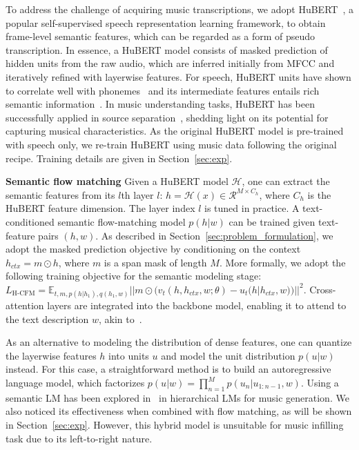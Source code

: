 To  address the challenge of acquiring music transcriptions, we adopt HuBERT~\cite{Hsu2021HuBERTSS}, a popular self-supervised speech representation learning framework, to obtain frame-level semantic features, which can be regarded as a form of pseudo transcription. In essence, a HuBERT model consists of masked prediction of hidden units from the raw audio, which are inferred initially from MFCC and iteratively refined with layerwise features. For speech, HuBERT units have shown to correlate well with phonemes~\cite{Hsu2021HuBERTSS} and its intermediate features entails rich semantic information~\cite{Pasad2023comparative}. In music understanding tasks, HuBERT has been successfully applied in source separation~\cite{Pasini2023SelfSupervisedMS}, shedding light on its potential for capturing musical characteristics. As the original HuBERT model is pre-trained with speech only, we re-train HuBERT using music data following the original recipe. Training details are given in Section~\ref{sec:exp}.

\textbf{Semantic flow matching} Given a HuBERT model $\mathcal{H}$, one can extract the semantic features from its $l$th layer $l$: $h = \mathcal{H}(x) \in \mathcal{R}^{M\times C_h}$, where $C_h$ is the HuBERT feature dimension. The layer index $l$ is tuned in practice. A text-conditioned semantic flow-matching model $p(h|w)$ can be trained given text-feature pairs $(h, w)$. As described in Section~\ref{sec:problem_formulation}, we adopt the masked prediction objective by conditioning on the context $h_{ctx}=m\odot h$, where $m$ is a span mask of length $M$. More formally, we adopt the following training objective for the semantic modeling stage: $L_{\text{H-CFM}}=\mathbb{E}_{t,m,p(h|h_1),q(h_1,w)}||m\odot(v_t(h,h_{ctx},w;\theta)-u_t(h|h_{ctx},w))||^2$.
Cross-attention layers are integrated into the backbone model, enabling it to attend to the text description $w$, akin to~\cite{rombach2021highresolution}. 

As an alternative to modeling the distribution of dense features, one can quantize the layerwise features $h$ into units $u$ and model the unit distribution $p(u|w)$ instead. For this case, a straightforward method is to build an autoregressive language model, which factorizes $p(u|w)=\displaystyle\prod_{n=1}^{M}p(u_{n}|u_{1:{n-1}},w)$. Using a semantic LM has been explored in~\cite{musiclm} in hierarchical LMs for music generation. We also noticed its effectiveness when combined with flow matching, as will be shown in Section~\ref{sec:exp}. However, this hybrid model is unsuitable for music infilling task due to its left-to-right nature.

